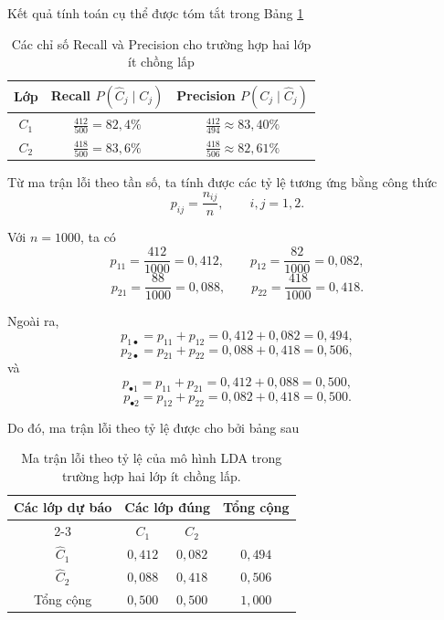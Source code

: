 Kết quả tính toán cụ thể được tóm tắt trong Bảng \ref{tab:metrics_summary1}

\begin{table}[H]
	\centering
	\renewcommand{\arraystretch}{1.5}
	\begin{tabular}{|c|c|c|}
		\hline
		\textbf{Lớp} & \textbf{Recall} $P(\hat{C}_j \mid C_j)$ & \textbf{Precision} $P(C_j \mid \hat{C}_j)$ \\
		\hline
		\textbf{$C_1$} & $\frac{412}{500} = 82{,}4\%$ & $\frac{412}{494} \approx 83{,}40\%$ \\
		\hline
		\textbf{$C_2$} & $\frac{418}{500} = 83{,}6\%$ & $\frac{418}{506} \approx 82{,}61\%$ \\
		\hline
	\end{tabular}
	\caption{Các chỉ số Recall và Precision cho trường hợp hai lớp ít chồng lấp}
	\label{tab:metrics_summary1}
\end{table}

Từ ma trận lỗi theo tần số, ta tính được các tỷ lệ tương ứng bằng công thức
\[
p_{ij}=\frac{n_{ij}}{n},\qquad i,j=1,2.
\]

Với $n=1000$, ta có
\[
p_{11}=\frac{412}{1000}=0{,}412,\qquad
p_{12}=\frac{82}{1000}=0{,}082,
\]
\[
p_{21}=\frac{88}{1000}=0{,}088,\qquad
p_{22}=\frac{418}{1000}=0{,}418.
\]

Ngoài ra,
\[
p_{1\bullet}=p_{11}+p_{12}=0{,}412+0{,}082=0{,}494,
\]
\[
p_{2\bullet}=p_{21}+p_{22}=0{,}088+0{,}418=0{,}506,
\]
và
\[
p_{\bullet 1}=p_{11}+p_{21}=0{,}412+0{,}088=0{,}500,
\]
\[
p_{\bullet 2}=p_{12}+p_{22}=0{,}082+0{,}418=0{,}500.
\]

Do đó, ma trận lỗi theo tỷ lệ được cho bởi bảng sau
\begin{table}[H]
	\centering
	\begin{tabular}{|c|cc|c|}
		\hline
		\multirow{2}{*}{Các lớp dự báo} 
		& \multicolumn{2}{c|}{Các lớp đúng} 
		& \multirow{2}{*}{Tổng cộng} \\ \cline{2-3}
		& $C_1$ & $C_2$ & \\ \hline
		$\hat{C}_1$ & $0{,}412$ & $0{,}082$ & $0{,}494$ \\
		$\hat{C}_2$ & $0{,}088$ & $0{,}418$ & $0{,}506$ \\ \hline
		Tổng cộng & $0{,}500$ & $0{,}500$  & $1{,}000$ \\ \hline
	\end{tabular}
	\caption{Ma trận lỗi theo tỷ lệ của mô hình LDA trong trường hợp hai lớp ít chồng lấp.}
	\label{tab:MaTranLoiTyLe_LDA_ItChongLap}
\end{table}

